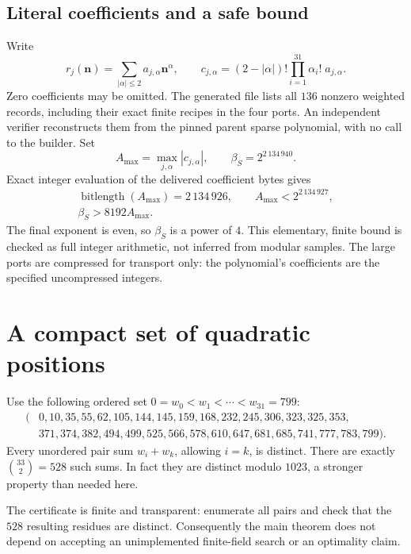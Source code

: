 \documentclass[11pt,a4paper]{article}
\theoremstyle{remark}
\newcommand{\file}[1]{\texttt{\path{#1}}}
\begin{document}
\subsection{Literal coefficients and a safe bound}
Write
\[
r_j(\mathbf n)=\sum_{|\alpha|\le2}a_{j,\alpha}\mathbf n^\alpha,\qquad
c_{j,\alpha}=(2-|\alpha|)!\prod_{i=1}^{31}\alpha_i!\;a_{j,\alpha}.
\]
Zero coefficients may be omitted. The generated file
\file{generated/source_records.json} lists all \(136\) nonzero
weighted records, including their exact finite recipes in the four
ports. An independent verifier reconstructs them from the pinned
parent sparse polynomial, with no call to the builder.
Set
\[
A_{\max}=\max_{j,\alpha}|c_{j,\alpha}|,\qquad
\beta_S=2^{2\,134\,940}.
\]
Exact integer evaluation of the delivered coefficient bytes gives
\begin{equation}\label{eq:bound}
\begin{gathered}
\operatorname{bitlength}(A_{\max})=2\,134\,926,\qquad
A_{\max}<2^{2\,134\,927},\\
\beta_S>8192 A_{\max}.
\end{gathered}
\end{equation}
The final exponent is even, so \(\beta_S\) is a power of \(4\).
This elementary, finite bound is checked as full integer arithmetic,
not inferred from modular samples. The large ports are compressed for
transport only: the polynomial's coefficients are the specified
uncompressed integers.

\section{A compact set of quadratic positions}\label{sec:sidon}
Use the following ordered set \(0=w_0<w_1<\cdots<w_{31}=799\):
\begin{equation}\label{eq:positions}
\begin{split}
(&0,10,35,55,62,105,144,145,159,168,232,245,306,323,325,353,\\
 &371,374,382,494,499,525,566,578,610,647,681,685,741,777,783,799).
\end{split}
\end{equation}
Every unordered pair sum \(w_i+w_k\), allowing \(i=k\), is distinct.
There are exactly \(\binom{33}{2}=528\) such sums. In fact they are
distinct modulo \(1023\), a stronger property than needed here.

The certificate is finite and transparent: enumerate all pairs and
check that the \(528\) resulting residues are distinct. Consequently
the main theorem does not depend on accepting an unimplemented
finite-field search or an optimality claim.
\end{document}
